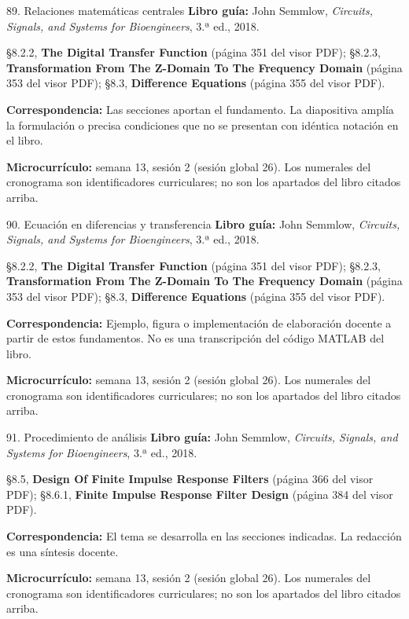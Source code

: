 \documentclass[
  10pt,
  ignorenonframetext,
  aspectratio=169,
  spanish,
]{beamer}
\begin{document}
\begin{frame}{89. Relaciones matemáticas centrales}
\label{relaciones-matemuxe1ticas-centrales-5}
\textbf{Libro guía:} John Semmlow, \emph{Circuits, Signals, and Systems
for Bioengineers}, 3.ª ed., 2018.

§8.2.2, \textbf{The Digital Transfer Function} (página 351 del visor
PDF); §8.2.3, \textbf{Transformation From The Z-Domain To The Frequency
Domain} (página 353 del visor PDF); §8.3, \textbf{Difference Equations}
(página 355 del visor PDF).

\textbf{Correspondencia:} Las secciones aportan el fundamento. La
diapositiva amplía la formulación o precisa condiciones que no se
presentan con idéntica notación en el libro.

\textbf{Microcurrículo:} semana 13, sesión 2 (sesión global 26). Los
numerales del cronograma son identificadores curriculares; no son los
apartados del libro citados arriba.
\end{frame}

\begin{frame}{90. Ecuación en diferencias y transferencia}
\label{ecuaciuxf3n-en-diferencias-y-transferencia}
\textbf{Libro guía:} John Semmlow, \emph{Circuits, Signals, and Systems
for Bioengineers}, 3.ª ed., 2018.

§8.2.2, \textbf{The Digital Transfer Function} (página 351 del visor
PDF); §8.2.3, \textbf{Transformation From The Z-Domain To The Frequency
Domain} (página 353 del visor PDF); §8.3, \textbf{Difference Equations}
(página 355 del visor PDF).

\textbf{Correspondencia:} Ejemplo, figura o implementación de
elaboración docente a partir de estos fundamentos. No es una
transcripción del código MATLAB del libro.

\textbf{Microcurrículo:} semana 13, sesión 2 (sesión global 26). Los
numerales del cronograma son identificadores curriculares; no son los
apartados del libro citados arriba.
\end{frame}

\begin{frame}{91. Procedimiento de análisis}
\label{procedimiento-de-anuxe1lisis-5}
\textbf{Libro guía:} John Semmlow, \emph{Circuits, Signals, and Systems
for Bioengineers}, 3.ª ed., 2018.

§8.5, \textbf{Design Of Finite Impulse Response Filters} (página 366 del
visor PDF); §8.6.1, \textbf{Finite Impulse Response Filter Design}
(página 384 del visor PDF).

\textbf{Correspondencia:} El tema se desarrolla en las secciones
indicadas. La redacción es una síntesis docente.

\textbf{Microcurrículo:} semana 13, sesión 2 (sesión global 26). Los
numerales del cronograma son identificadores curriculares; no son los
apartados del libro citados arriba.
\end{frame}
\end{document}
